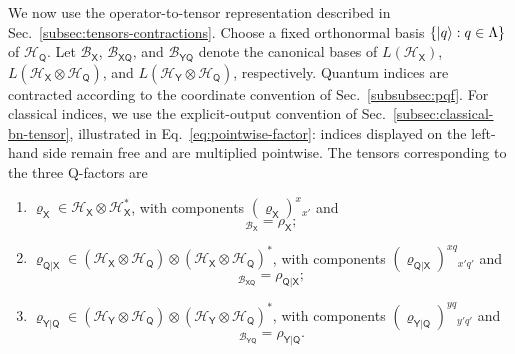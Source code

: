 \documentclass[
    aps,
    pra,
    reprint,
    superscriptaddress,
    nofootinbib
]{revtex4-2}
\theoremstyle{definition}
\theoremstyle{plain}
\begin{document}
We now use the operator-to-tensor representation described in
Sec.~\ref{subsec:tensors-contractions}. Choose a fixed orthonormal basis
$\{\ket{q}:q\in\Lambda\}$ of
$\mathcal{H}_{\mathsf{Q}}$. Let $\mathcal{B}_{\mathsf{X}}$,
$\mathcal{B}_{\mathsf{X}\mathsf{Q}}$, and
$\mathcal{B}_{\mathsf{Y}\mathsf{Q}}$ denote the canonical bases of
$L(\mathcal{H}_{\mathsf{X}})$,
$L(\mathcal{H}_{\mathsf{X}}\otimes\mathcal{H}_{\mathsf{Q}})$, and
$L(\mathcal{H}_{\mathsf{Y}}\otimes\mathcal{H}_{\mathsf{Q}})$,
respectively. Quantum indices are contracted according to the coordinate
convention of Sec.~\ref{subsubsec:pqf}. For classical indices, we use the
explicit-output convention of Sec.~\ref{subsec:classical-bn-tensor},
illustrated in Eq.~\ref{eq:pointwise-factor}: indices displayed on the
left-hand side remain free and are multiplied pointwise. The tensors
corresponding to the three Q-factors are
\begin{enumerate}
    \item
    $\varrho_{\mathsf{X}}
    \in
    \mathcal{H}_{\mathsf{X}}
    \otimes
    \mathcal{H}_{\mathsf{X}}^{*}$,
    with components
    $(\varrho_{\mathsf{X}})^{x}{}_{x'}$ and
    \begin{equation}
        [\varrho_{\mathsf{X}}]_{\mathcal{B}_{\mathsf{X}}}
        =
        \rho_{\mathsf{X}};
    \end{equation}

    \item
    $\varrho_{\mathsf{Q}|\mathsf{X}}
    \in
    (\mathcal{H}_{\mathsf{X}}\otimes\mathcal{H}_{\mathsf{Q}})
    \otimes
    (\mathcal{H}_{\mathsf{X}}\otimes\mathcal{H}_{\mathsf{Q}})^{*}$,
    with components
    $(\varrho_{\mathsf{Q}|\mathsf{X}})^{xq}{}_{x'q'}$ and
    \begin{equation}
        [\varrho_{\mathsf{Q}|\mathsf{X}}]
        _{\mathcal{B}_{\mathsf{X}\mathsf{Q}}}
        =
        \rho_{\mathsf{Q}|\mathsf{X}};
    \end{equation}

    \item
    $\varrho_{\mathsf{Y}|\mathsf{Q}}
    \in
    (\mathcal{H}_{\mathsf{Y}}\otimes\mathcal{H}_{\mathsf{Q}})
    \otimes
    (\mathcal{H}_{\mathsf{Y}}\otimes\mathcal{H}_{\mathsf{Q}})^{*}$,
    with components
    $(\varrho_{\mathsf{Y}|\mathsf{Q}})^{yq}{}_{y'q'}$ and
    \begin{equation}
        [\varrho_{\mathsf{Y}|\mathsf{Q}}]
        _{\mathcal{B}_{\mathsf{Y}\mathsf{Q}}}
        =
        \rho_{\mathsf{Y}|\mathsf{Q}}.
    \end{equation}
\end{enumerate}
\end{document}

